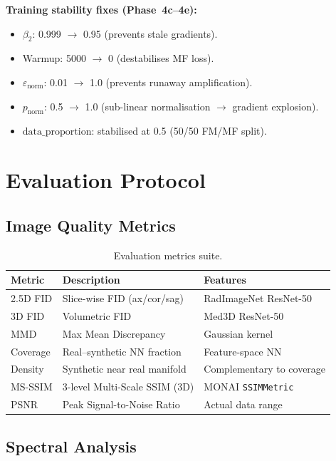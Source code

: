 \documentclass[11pt,a4paper]{article}
\newcommand{\code}[1]{\texttt{#1}}
\begin{document}
\textbf{Training stability fixes (Phase~4c--4e):}
\begin{itemize}[nosep]
  \item $\beta_2$: 0.999 $\to$ 0.95 (prevents stale gradients).
  \item Warmup: 5000 $\to$ 0 (destabilises MF loss).
  \item $\varepsilon_{\mathrm{norm}}$: 0.01 $\to$ 1.0 (prevents runaway
        amplification).
  \item $p_{\mathrm{norm}}$: 0.5 $\to$ 1.0 (sub-linear normalisation
        $\to$ gradient explosion).
  \item $\mathrm{data\_proportion}$: stabilised at 0.5 (50/50 FM/MF split).
\end{itemize}


\section{Evaluation Protocol}
\label{sec:evaluation}

\subsection{Image Quality Metrics}

\begin{table}[ht]
\centering
\caption{Evaluation metrics suite.}
\label{tab:metrics}
\begin{tabular}{lll}
\toprule
\textbf{Metric} & \textbf{Description} & \textbf{Features} \\
\midrule
2.5D FID  & Slice-wise FID (ax/cor/sag)   & RadImageNet ResNet-50 \\
3D FID    & Volumetric FID               & Med3D ResNet-50 \\
MMD       & Max Mean Discrepancy         & Gaussian kernel \\
Coverage  & Real--synthetic NN fraction  & Feature-space NN \\
Density   & Synthetic near real manifold & Complementary to coverage \\
MS-SSIM   & 3-level Multi-Scale SSIM (3D) & MONAI \code{SSIMMetric} \\
PSNR      & Peak Signal-to-Noise Ratio   & Actual data range \\
\bottomrule
\end{tabular}
\end{table}

\subsection{Spectral Analysis}
\end{document}

